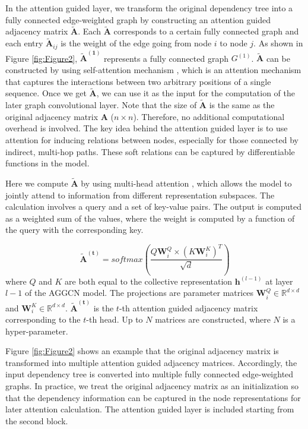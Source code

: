 \documentclass[11pt,a4paper]{article}
\begin{document}
In the attention guided layer, we transform the original dependency tree into a fully connected edge-weighted graph by 
constructing an attention guided adjacency matrix $\mathbf{\tilde{A}}$. Each $\mathbf{\tilde{A}}$ corresponds to a certain fully connected graph and each entry $\mathbf{\tilde{A}}_{ij}$ is the weight of the edge going from node $i$ to node $j$. As shown in Figure \ref{fig:Figure2}, $\mathbf{\tilde{A}^{(1)}}$ represents a fully connected graph $G^{(1)}$. $\mathbf{\tilde{A}}$ can be constructed by using self-attention mechanism \citep{Cheng2016LongSM}, which is an attention mechanism \citep{Bahdanau2015NeuralMT} that captures the interactions between two arbitrary positions of a single sequence. Once we get $\mathbf{\tilde{A}}$, we can use it as the input for the computation of the later graph convolutional layer. Note that the size of $\mathbf{\tilde{A}}$ is the same as the original adjacency matrix $\mathbf{A}$ ($n \times n$). Therefore, no additional computational overhead is involved. The key idea behind the attention guided layer is to use attention for inducing relations between nodes, especially for those connected by indirect, multi-hop paths. These soft relations can be captured by differentiable functions in the model. 

Here we compute $\mathbf{\tilde{A}}$ by using multi-head attention \citep{Vaswani2017AttentionIA}, which allows the model to jointly attend to information from different representation subspaces. The calculation involves a query and a set of key-value pairs. The output is computed as a weighted sum of the values, where the weight is computed by a function of the query with the corresponding key.

\begin{equation}
\mathbf{\tilde{A}^{(t)}} = softmax(\frac{Q\mathbf{W}_{i}^{Q} \times (K\mathbf{W}_{i}^{K})^{T}}{\sqrt{d}})
\end{equation}
where $Q$ and $K$ are both equal to the collective representation $\mathbf{h}^{(l-1)}$ at layer $l-1$ of the AGGCN model. The projections are parameter matrices $\mathbf{W}_{i}^{Q} \in \mathbb{R}^{d \times d}$ and $\mathbf{W}_{i}^{K} \in \mathbb{R}^{d \times d}$. $\mathbf{\tilde{A}^{(t)}}$ is the $t$-th attention guided adjacency matrix corresponding to the $t$-th head. Up to $N$ matrices are constructed, where $N$ is a hyper-parameter.


Figure \ref{fig:Figure2} shows an example that the original adjacency matrix is transformed into multiple attention guided adjacency matrices. Accordingly, the input dependency tree is converted into multiple fully connected edge-weighted graphs. In practice, we treat the original adjacency matrix as an initialization so that the dependency information can be captured in the node representations for later attention calculation. The attention guided layer is included starting from the second block.
\end{document}
